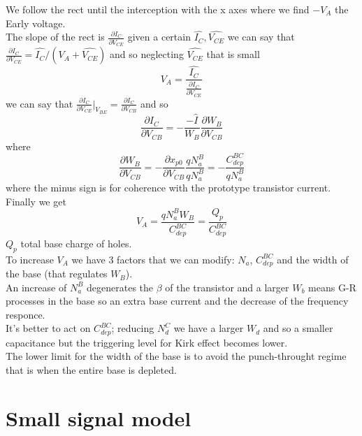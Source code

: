 We follow the rect until the interception with the x axes where we find $-V_A$ the Early voltage.\\
The slope of the rect is $\frac{\partial I_C}{\partial V_{CE}}$ given a certain $\hat{I_C},\hat{V_{CE}}$ we can say that $\frac{\partial I_C}{\partial V_{CE}}=\hat{I_C}/(V_A+\hat{V_{CE}})$ and so neglecting $\hat{V_{CE}}$ that is small
\begin{equation}
V_A=\frac{\hat{I_C}}{\frac{\partial I_C}{\partial V_{CE}}}
\end{equation}
we can say that $\frac{\partial I_C}{\partial V_{CE}}|_{V_{BE}}=\frac{\partial I_C}{\partial V_{CB}}$ and so
\begin{equation}
\frac{\partial I_C}{\partial V_{CB}}=-\frac{-\hat{I}}{W_B}\frac{\partial W_B }{\partial V_{CB}}
\end{equation}  
where
\begin{equation}
\frac{\partial W_B }{\partial V_{CB}}=-\frac{\partial x_{p0}}{\partial V_{CB}}\frac{qN_a^B}{qN_a^B}=-\frac{C_{dep}^{BC}}{qN_a^B}
\end{equation}
where the minus sign is for coherence with the prototype transistor current.
Finally we get
\begin{equation}
V_A=\frac{qN_a^BW_B}{C_{dep}^{BC}}=\frac{Q_p}{C_{dep}^{BC}}
\end{equation}
$Q_p$ total base charge of holes.\\
\vspace{5mm}
To increase $V_A$ we have 3 factors that we can modify: $N_a$, $C_{dep}^{BC}$ and the width of the base (that regulates $W_B$).\\
An increase of $N_a^B$ degenerates the $\beta$ of the transistor and a larger $W_b$ means G-R processes in the base so an extra base current and the decrease of the frequency responce.\\
It's better to act on $C_{dep}^{BC}$; reducing $N_d^C$ we have a larger $W_d$ and so a smaller capacitance but the triggering level for Kirk effect becomes lower.\\
\vspace{5mm}
The lower limit for the width of the base is to avoid the punch-throught regime that is when the entire base is depleted.\\

\section{Small signal model}

